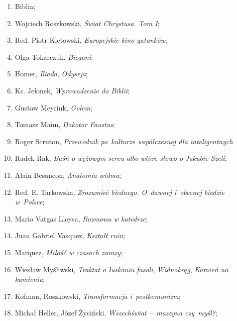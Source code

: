 \documentclass[a4paper,11pt]{article}
\begin{document}
\begin{enumerate}

\item Biblia;

\item Wojciech Roszkowski, \emph{Świat Chrystusa. Tom I};

\item Red. Piotr Kletowski, \emph{Europejskie kino gatunków};

\item Olga Tokarczuk, \emph{Bieguni};

\item Homer, \emph{Iliada}, \emph{Odyseja};

\item Ks. Jelonek, \emph{Wprowadzenie do Biblii};

\item Gustaw Meyrink, \emph{Golem};

\item Tomasz Mann, \emph{Dokotor Faustus};

\item Roger Scruton, \emph{Przewodnik po~kulturze współczesnej dla
    inteligentnych}

\item Radek Rak, \emph{Baśń o wężowym sercu albo wtóre słowo o Jakubie
    Szeli};

\item Alain Besancon, \emph{Anatomia widma};

\item Red. E. Tarkowska, \emph{Zrozumieć biednego. O~dawnej i~obecnej
    biedzie w~Polsce};

\item Mario Vatgas Lloysa, \emph{Rozmowa w katedrze};

\item Juan Gabriel Vasquez, \emph{Kształt ruin};

\item Marquez, \emph{Miłość w czasach zarazy};

\item Wiesław Myśliwski, \emph{Traktat o łuskaniu fasoli},
  \emph{Widnokrąg}, \emph{Kamień na kamieniu};

\item Kofman, Roszkowski, \emph{Transformacja i~postkomunizm};

\item Michał Heller, Józef Życiński, \emph{Wszechświat --~maszyna
    czy~myśl?};


\end{enumerate}
\end{document}
